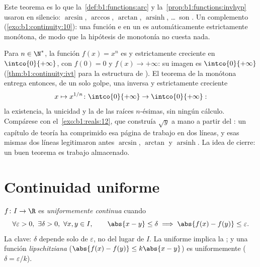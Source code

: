\begin{remark}
Este teorema es lo que la~\cref{def:b1:functions:arc} y
la~\cref{prop:b1:functions:invhyp} usaron en silencio: $\arcsin$,
$\arccos$, $\arctan$, $\operatorname{arsinh}$, \dots\ son
. Un complemento (\cref{exo:b1:continuity:10}): una
función  e \emph{} en un  es
automáticamente estrictamente monótona, de modo que la hipótesis de
monotonía no cuesta nada.
\end{remark}

\begin{example}\label{ex:b1:continuity:nthroot}
Para $n \in \N^*$, la función $f(x) = x^n$ es  y
estrictamente creciente en $\intco{0}{+\infty}$, con $f(0) = 0$ y
$f(x) \to +\infty$: su imagen es $\intco{0}{+\infty}$
(\cref{thm:b1:continuity:ivt} para la estructura de ). El
teorema de la  monótona entrega entonces, de un solo golpe,
una inversa \emph{} y estrictamente creciente
\[
x \mapsto x^{1/n} \colon \intco{0}{+\infty} \to
\intco{0}{+\infty} :
\]
la existencia, la unicidad y la  de las raíces $n$-ésimas,
sin ningún cálculo. Compárese con el~\cref{exo:b1:reals:12}, que
construía $\sqrt y$ a mano a partir del : un capítulo de teoría
ha comprimido esa página de trabajo en dos líneas, y esas mismas dos
líneas legitimaron antes $\arcsin$, $\arctan$ y
$\operatorname{arsinh}$. La idea de cierre: un buen teorema es trabajo
almacenado.
\end{example}

\section{Continuidad uniforme}

\begin{definition}\label{def:b1:continuity:uniform}
$f \colon I \to \R$ es \emph{uniformemente continua} cuando
\[
\forall \varepsilon > 0,\ \exists \delta > 0,\ \forall x, y \in I,
\qquad \abs{x - y} \leq \delta \implies \abs{f(x) - f(y)} \leq
\varepsilon .
\]
La clave: $\delta$ depende solo de $\varepsilon$, no del lugar de
$I$. La  uniforme implica la ; y una función
\emph{lipschitziana} ($\abs{f(x) - f(y)} \leq k \abs{x - y}$) es
uniformemente  ($\delta = \varepsilon/k$).
\end{definition}

